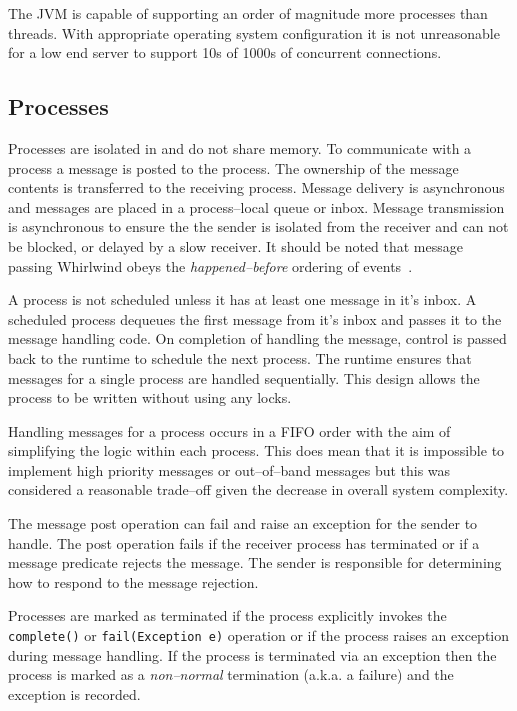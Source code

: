 \documentclass[conference]{IEEEtran}
\begin{document}
The JVM is capable of supporting an order of magnitude more processes than threads. With appropriate operating system configuration it is not unreasonable for a low end server to support 10s of 1000s of concurrent connections.

\subsection{Processes}
\label{section:Processes}

Processes are isolated in and do not share memory. To communicate with a process a message is posted to the process. The ownership of the message contents is transferred to the receiving process. Message delivery is asynchronous and messages are placed in a process--local queue or inbox. Message transmission is asynchronous to ensure the the sender is isolated from the receiver and can not be blocked, or delayed by a slow receiver. It should be noted that message passing Whirlwind obeys the \emph{happened--before} ordering of events~\cite{lamport78}.

A process is not scheduled unless it has at least one message in it's inbox. A scheduled process dequeues the first message from it's inbox and passes it to the message handling code. On completion of handling the message, control is passed back to the runtime to schedule the next process. The runtime ensures that messages for a single process are handled sequentially. This design allows the process to be written without using any locks.


Handling messages for a process occurs in a FIFO order with the aim of simplifying the logic within each process. This does mean that it is impossible to implement high priority messages or out--of--band messages but this was considered a reasonable trade--off given the decrease in overall system complexity.

The message post operation can fail and raise an exception for the sender to handle. The post operation fails if the receiver process has terminated or if a message predicate rejects the message. The sender is responsible for determining how to respond to the message rejection.

Processes are marked as terminated if the process explicitly invokes the \verb+complete()+ or \verb+fail(Exception e)+ operation or if the process raises an exception during message handling. If the process is terminated via an exception then the process is marked as a \emph{non--normal} termination (a.k.a. a failure) and the exception is recorded. 
\end{document}
